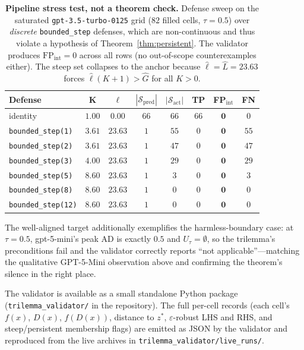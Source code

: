 \documentclass{article}
\begin{document}
\begin{table}[h]
\centering
\small
\caption{\textbf{Pipeline stress test, not a theorem check.}
Defense sweep on the saturated \texttt{gpt-3.5-turbo-0125} grid
($82$ filled cells, $\tau = 0.5$) over \emph{discrete}
\texttt{bounded\_step} defenses, which are non-continuous and
thus violate a hypothesis of Theorem~\ref{thm:persistent}. The
validator produces $\text{FP}_{\text{int}} = 0$ across all rows
(no out-of-scope counterexamples either). The steep set
collapses to the anchor because $\hat\ell = \hat L = 23.63$
forces $\hat\ell(K{+}1) > \hat G$ for all $K > 0$.}
\label{tab:live-sweep}
\begin{tabular}{lccccccc}
\toprule
\textbf{Defense} & $\boldsymbol{K}$ & $\boldsymbol{\ell}$ & $|\mathcal{S}_{\text{pred}}|$ & $|\mathcal{S}_{\text{act}}|$ & \textbf{TP} & \textbf{FP}$_{\text{int}}$ & \textbf{FN} \\
\midrule
identity                           & $1.00$ & $0.00$  & $66$ & $66$ & $66$ & $\mathbf{0}$ & $0$ \\
\texttt{bounded\_step(1)}          & $3.61$ & $23.63$ & $1$  & $55$ & $0$  & $\mathbf{0}$ & $55$ \\
\texttt{bounded\_step(2)}          & $3.61$ & $23.63$ & $1$  & $47$ & $0$  & $\mathbf{0}$ & $47$ \\
\texttt{bounded\_step(3)}          & $4.00$ & $23.63$ & $1$  & $29$ & $0$  & $\mathbf{0}$ & $29$ \\
\texttt{bounded\_step(5)}          & $8.60$ & $23.63$ & $1$  & $3$  & $0$  & $\mathbf{0}$ & $3$  \\
\texttt{bounded\_step(8)}          & $8.60$ & $23.63$ & $1$  & $0$  & $0$  & $\mathbf{0}$ & $0$  \\
\texttt{bounded\_step(12)}         & $8.60$ & $23.63$ & $1$  & $0$  & $0$  & $\mathbf{0}$ & $0$  \\
\bottomrule
\end{tabular}
\end{table}

The well-aligned target additionally exemplifies the
harmless-boundary case: at $\tau = 0.5$, gpt-5-mini's peak AD is
exactly $0.5$ and $U_\tau = \emptyset$, so the trilemma's
preconditions fail and the validator correctly reports
``not applicable''---matching the qualitative GPT-5-Mini
observation above and confirming the theorem's silence in the
right place.

The validator is available as a small standalone Python package
(\texttt{trilemma\_validator/} in the repository). The full
per-cell records (each cell's $f(x)$, $D(x)$, $f(D(x))$, distance
to $z^{*}$, $\varepsilon$-robust LHS and RHS, and steep/persistent
membership flags) are emitted as JSON by the validator and
reproduced from the live archives in
\texttt{trilemma\_validator/live\_runs/}.
\end{document}

